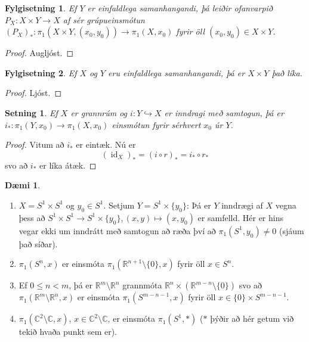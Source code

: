 \documentclass[a4paper,icelandic]{book}
\theoremstyle{definition}
\newtheorem{daemi}{Dæmi}[section]
\theoremstyle{plain}
\newtheorem{setn}{Setning}[section]
\newtheorem{fylgisetn}{Fylgisetning}[section]
\theoremstyle{remark}
\newcommand{\R}{\mathbb{R}} %
\newcommand{\C}{\mathbb{C}} %
\DeclareMathOperator{\id}{id} %
\begin{document}
\begin{fylgisetn}
  Ef $Y$ er einfaldlega samanhangandi, þá leiðir ofanvarpið $P_X:X\times
  Y\to X$ af sér grúpueinsmótun $(P_X)_*:\pi_1(X\times Y, (x_0,
  y_0))\to\pi_1(X,x_0)$ fyrir öll $(x_0,y_0)\in X\times Y$.
\end{fylgisetn}
\begin{proof}
  Augljóst.
\end{proof}
\begin{fylgisetn}
  Ef $X$ og $Y$ eru einfaldlega samanhangandi, þá er $X\times Y$ það
  líka.
\end{fylgisetn}
\begin{proof}
  Ljóst.
\end{proof}
\begin{setn}
  Ef $X$ er grannrúm og $i: Y\hookrightarrow X$ er \emph{inndragi með
  samtogun}, þá er
  $i_*:\pi_1(Y,x_0)\to\pi_1(X,x_0)$ einsmótun fyrir sérhvert $x_0$ úr
  $Y$.
\end{setn}
\begin{proof}
  Vitum að $i_*$ er eintæk. Nú er \[
  (\id_X)_* = (i\circ r)_* = i_*\circ r_*
  \]
  svo að $i_*$ er líka átæk.
\end{proof}
\begin{daemi}
  \begin{enumerate}[(1)]
    \item $X = S^1\times S^1$ og $y_0\in S^1$. Setjum $Y =
      S^1\times\{y_0\}$: Þá er $Y$ inndrægi af $X$ vegna þess að
      $S^1\times S^1\to S^1\times\{y_0\}, (x,y)\mapsto(x,y_0)$ er
      samfelld. Hér er hins vegar ekki um inndrátt með samtogun að ræða
      því að $\pi_1(S^1,y_0)\neq 0$ (sjáum það síðar).
    \item $\pi_1(S^n,x)$ er einsmóta $\pi_1(\R^{n+1}\setminus \{0\},x)$
      fyrir öll $x\in S^n$. 
    \item Ef $0\leq n < m$, þá er $\R^m\setminus\R^n$ grannmóta
      $\R^n\times (\R^{m-n}\setminus \{0\})$ svo að
      $\pi_1(\R^m\setminus\R^n,x)$ er einsmóta $\pi_1(S^{m-n-1},x)$
      fyrir öll $x\in \{0\}\times S^{m-n-1}$.
    \item $\pi_1(\C^2\setminus\C,x)$, $x\in\C^2\setminus\C$, er einsmóta
      $\pi_1(S^1,*)$ ($*$ þýðir að hér getum við tekið hvaða punkt sem
      er).
  \end{enumerate}
\end{daemi}
\end{document}
